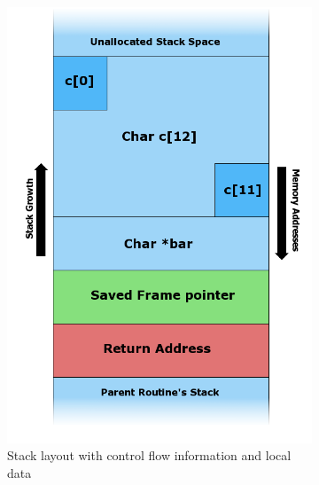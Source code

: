 \begin{figure}[htb]
	\centering
	\begin{subfigure}[t]{0.3\textwidth}
		\centering
		\includegraphics[height=0.25\textheight]{figures/Stack_Overflow_2}
		\caption{Stack layout with control flow information and local data \cite{Lynn2007}}
		\label{fig:stack-layout-without-data}
	\end{subfigure}
	\hfill
	\begin{subfigure}[t]{0.3\textwidth}
		\centering

\end{subfigure}
\end{figure}
